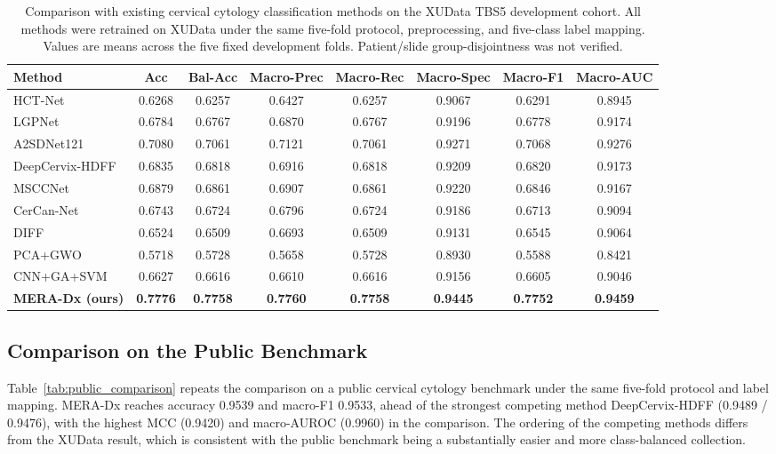 \documentclass[conference]{IEEEtran}
\begin{document}
\begin{table}[!t]
\centering
\small
\caption{Comparison with existing cervical cytology classification methods on
the XUData TBS5 development cohort. All methods were retrained on XUData
under the same five-fold protocol, preprocessing, and five-class label
mapping. Values are means across the five fixed development folds.
Patient/slide group-disjointness was not verified.}
\label{tab:backbone_comparison}
\setlength{\tabcolsep}{4pt}
\begin{tabular*}{\textwidth}{@{\extracolsep{\fill}}lccccccc@{}}
\toprule
\textbf{Method} & \textbf{Acc} & \textbf{Bal-Acc} & \textbf{Macro-Prec} & \textbf{Macro-Rec} & \textbf{Macro-Spec} & \textbf{Macro-F1} & \textbf{Macro-AUC} \\
\midrule
HCT-Net         & 0.6268 & 0.6257 & 0.6427 & 0.6257 & 0.9067 & 0.6291 & 0.8945 \\
LGPNet          & 0.6784 & 0.6767 & 0.6870 & 0.6767 & 0.9196 & 0.6778 & 0.9174 \\
A2SDNet121      & 0.7080 & 0.7061 & 0.7121 & 0.7061 & 0.9271 & 0.7068 & 0.9276 \\
DeepCervix-HDFF & 0.6835 & 0.6818 & 0.6916 & 0.6818 & 0.9209 & 0.6820 & 0.9173 \\
MSCCNet         & 0.6879 & 0.6861 & 0.6907 & 0.6861 & 0.9220 & 0.6846 & 0.9167 \\
CerCan-Net      & 0.6743 & 0.6724 & 0.6796 & 0.6724 & 0.9186 & 0.6713 & 0.9094 \\
DIFF            & 0.6524 & 0.6509 & 0.6693 & 0.6509 & 0.9131 & 0.6545 & 0.9064 \\
PCA+GWO         & 0.5718 & 0.5728 & 0.5658 & 0.5728 & 0.8930 & 0.5588 & 0.8421 \\
CNN+GA+SVM      & 0.6627 & 0.6616 & 0.6610 & 0.6616 & 0.9156 & 0.6605 & 0.9046 \\
\midrule
\textbf{MERA-Dx (ours)} & \textbf{0.7776} & \textbf{0.7758} & \textbf{0.7760} & \textbf{0.7758} & \textbf{0.9445} & \textbf{0.7752} & \textbf{0.9459} \\
\bottomrule
\end{tabular*}
\end{table}

\subsection{Comparison on the Public Benchmark}
\label{sec:public_comparison}
Table~\ref{tab:public_comparison} repeats the comparison on a public cervical
cytology benchmark under the same five-fold protocol and label mapping.
MERA-Dx reaches accuracy 0.9539 and macro-F1 0.9533, ahead of the strongest
competing method DeepCervix-HDFF (0.9489 / 0.9476), with the highest MCC
(0.9420) and macro-AUROC (0.9960) in the comparison. The ordering of the
competing methods differs from the XUData result, which is consistent with the
public benchmark being a substantially easier and more class-balanced
collection.
\end{document}
